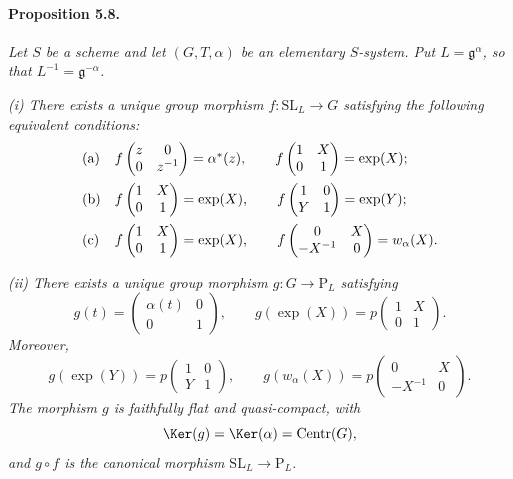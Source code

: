 \paragraph{\textbf{Proposition 5.8.}}
\emph{Let \(S\) be a scheme and let \((G,T,\alpha)\) be an
elementary \(S\)-system.  Put \(L=\mathfrak g^\alpha\), so that
\(L^{-1}=\mathfrak g^{-\alpha}\).}

\emph{\textup{(i)} There exists a unique group morphism
\(f\colon\mathrm{SL}_L\to G\) satisfying the following equivalent
conditions:}
\[
\begin{array}{ll}
\textup{(a)}
&
f\begin{pmatrix}z&0\\0&z^{-1}\end{pmatrix}=\alpha^\ast(z),
\qquad
f\begin{pmatrix}1&X\\0&1\end{pmatrix}=\exp(X);
\\[1.1em]
\textup{(b)}
&
f\begin{pmatrix}1&X\\0&1\end{pmatrix}=\exp(X),
\qquad
f\begin{pmatrix}1&0\\Y&1\end{pmatrix}=\exp(Y);
\\[1.1em]
\textup{(c)}
&
f\begin{pmatrix}1&X\\0&1\end{pmatrix}=\exp(X),
\qquad
f\begin{pmatrix}0&X\\-X^{-1}&0\end{pmatrix}=w_\alpha(X).
\end{array}
\]

\emph{\textup{(ii)} There exists a unique group morphism
\(g\colon G\to\mathrm P_L\) satisfying}
\[
 g(t)=
 \begin{pmatrix}\alpha(t)&0\\0&1\end{pmatrix},
 \qquad
 g(\exp(X))
 =p\begin{pmatrix}1&X\\0&1\end{pmatrix}.
\]
\emph{Moreover,}
\[
 g(\exp(Y))
 =p\begin{pmatrix}1&0\\Y&1\end{pmatrix},
 \qquad
 g(w_\alpha(X))
 =p\begin{pmatrix}0&X\\-X^{-1}&0\end{pmatrix}.
\]
\emph{The morphism \(g\) is faithfully flat and quasi-compact, with}
\[
 \Ker(g)=\Ker(\alpha)=\operatorname{Centr}(G),
\]
\emph{and \(g\circ f\) is the canonical morphism
\(\mathrm{SL}_L\to\mathrm P_L\).}

